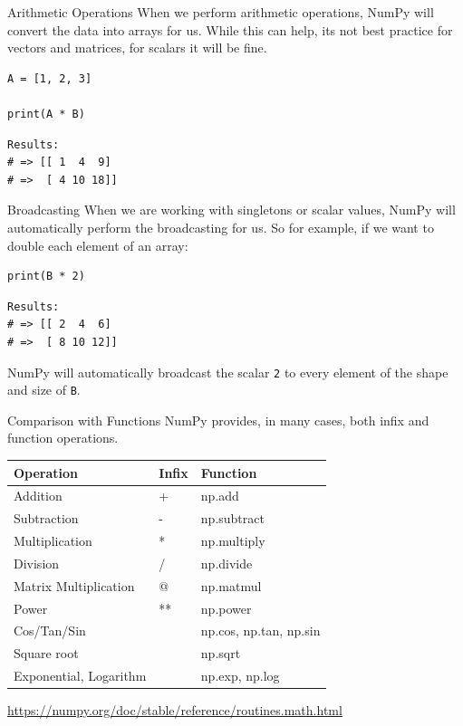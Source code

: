 \documentclass[10pt]{beamer}
\begin{document}
\begin{frame}[label={sec:orga35f1dc},fragile]{Arithmetic Operations}
 When we perform arithmetic operations, NumPy will convert the data into arrays for
us. While this can help, its not best practice for vectors and matrices, for scalars
it will be fine.

\begin{verbatim}
A = [1, 2, 3]

print(A * B)
\end{verbatim}

\begin{verbatim}
Results: 
# => [[ 1  4  9]
# =>  [ 4 10 18]]
\end{verbatim}
\end{frame}

\begin{frame}[label={sec:org48535d4},fragile]{Broadcasting}
 When we are working with singletons or scalar values, NumPy will automatically
perform the broadcasting for us. So for example, if we want to double each element of
an array:

\begin{verbatim}
print(B * 2)
\end{verbatim}

\begin{verbatim}
Results: 
# => [[ 2  4  6]
# =>  [ 8 10 12]]
\end{verbatim}


NumPy will automatically broadcast the scalar \texttt{2} to every element of the shape and
size of \texttt{B}.
\end{frame}

\begin{frame}[label={sec:orgd0c43ed}]{Comparison with Functions}
NumPy provides, in many cases, both infix and function operations.

\begin{center}
\begin{tabular}{lll}
Operation & Infix & Function\\
\hline
Addition & + & np.add\\
Subtraction & - & np.subtract\\
Multiplication & * & np.multiply\\
Division & / & np.divide\\
Matrix Multiplication & @ & np.matmul\\
Power & ** & np.power\\
Cos/Tan/Sin &  & np.cos, np.tan, np.sin\\
Square root &  & np.sqrt\\
Exponential, Logarithm &  & np.exp, np.log\\
\end{tabular}
\end{center}

\url{https://numpy.org/doc/stable/reference/routines.math.html}
\end{frame}
\end{document}
